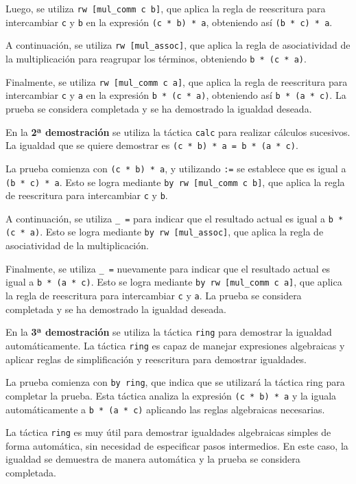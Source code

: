 Luego, se utiliza \texttt{rw [mul\_comm c b]}, que aplica la regla de reescritura
para intercambiar \texttt{c} y \texttt{b} en la expresión \texttt{(c * b) * a}, obteniendo así \texttt{(b *
c) * a}.

A continuación, se utiliza \texttt{rw [mul\_assoc]}, que aplica la regla de
asociatividad de la multiplicación para reagrupar los términos,
obteniendo \texttt{b * (c * a)}.

Finalmente, se utiliza \texttt{rw [mul\_comm c a]}, que aplica la regla de
reescritura para intercambiar \texttt{c} y \texttt{a} en la expresión \texttt{b * (c * a)},
obteniendo así \texttt{b * (a * c)}. La prueba se considera completada y se ha
demostrado la igualdad deseada.

En la \textbf{2ª demostración} se utiliza la táctica \texttt{calc} para realizar
cálculos sucesivos. La igualdad que se quiere demostrar es
\texttt{(c * b) * a = b * (a * c)}.

La prueba comienza con \texttt{(c * b) * a}, y utilizando \texttt{:=} se establece que es
igual a \texttt{(b * c) * a}. Esto se logra mediante \texttt{by rw [mul\_comm c b]}, que
aplica la regla de reescritura para intercambiar \texttt{c} y \texttt{b}.

A continuación, se utiliza \texttt{\_ =} para indicar que el resultado actual es
igual a \texttt{b * (c * a)}. Esto se logra mediante \texttt{by rw [mul\_assoc]}, que
aplica la regla de asociatividad de la multiplicación.

Finalmente, se utiliza \texttt{\_ =} nuevamente para indicar que el resultado actual
es igual a \texttt{b * (a * c)}. Esto se logra mediante \texttt{by rw [mul\_comm c a]}, que
aplica la regla de reescritura para intercambiar \texttt{c} y \texttt{a}. La prueba se
considera completada y se ha demostrado la igualdad deseada.

En la \textbf{3ª demostración} se utiliza la táctica \texttt{ring} para demostrar la
igualdad automáticamente. La táctica \texttt{ring} es capaz de manejar
expresiones algebraicas y aplicar reglas de simplificación y reescritura
para demostrar igualdades.

La prueba comienza con \texttt{by ring}, que indica que se utilizará la táctica
ring para completar la prueba. Esta táctica analiza la expresión
\texttt{(c * b) * a} y la iguala automáticamente a \texttt{b * (a * c)} aplicando las reglas
algebraicas necesarias.

La táctica \texttt{ring} es muy útil para demostrar igualdades algebraicas
simples de forma automática, sin necesidad de especificar pasos
intermedios. En este caso, la igualdad se demuestra de manera automática
y la prueba se considera completada.

